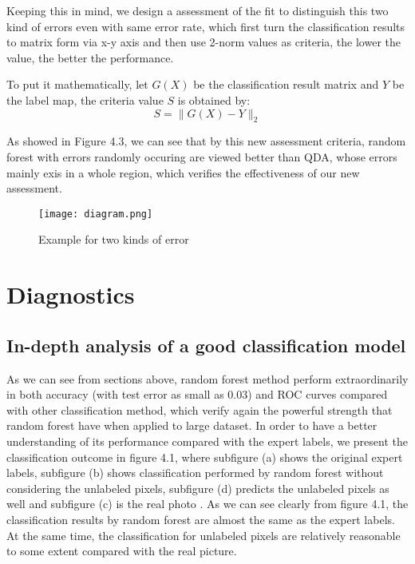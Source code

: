 \documentclass[11pt]{scrartcl} %
\begin{document}
Keeping this in mind, we design a assessment of the fit to distinguish this two kind of errors even with same error rate, which first turn the classification results to matrix form via x-y axis and then use 2-norm values as criteria, the lower the value, the better the performance.

To put it mathematically, let $G(X)$ be the classification result matrix and $Y$ be the label map, the criteria value $S$ is obtained by:
$$S = \|G(X) - Y\|_2$$

As showed in Figure 4.3, we can see that by this new assessment criteria, random forest with errors randomly occuring are viewed better than QDA, whose errors mainly exis in a whole region, which verifies the effectiveness of our new assessment.

\begin{figure}[htb]
	\centering
	\texttt{[image: diagram.png]} %
	\caption{Example for two kinds of error}
\end{figure}


\section{Diagnostics}
\subsection{In-depth analysis of a good classification model}
As we can see from sections above, random forest method perform extraordinarily in both accuracy (with test error as small as 0.03) and ROC curves compared with other classification method, which verify again the powerful strength that random forest have when applied to large dataset. In order to have a better understanding of its performance compared with the expert labels, we present the classification outcome in figure 4.1, where subfigure (a) shows the original expert labels, subfigure (b) shows classification performed by random forest without considering the unlabeled pixels, subfigure (d) predicts the unlabeled pixels as well and subfigure (c) is the real photo . As we can see clearly from figure 4.1, the classification results by random forest are almost the same as the expert labels. At the same time, the classification for unlabeled pixels are relatively reasonable to some extent compared with the real picture.
\end{document}
